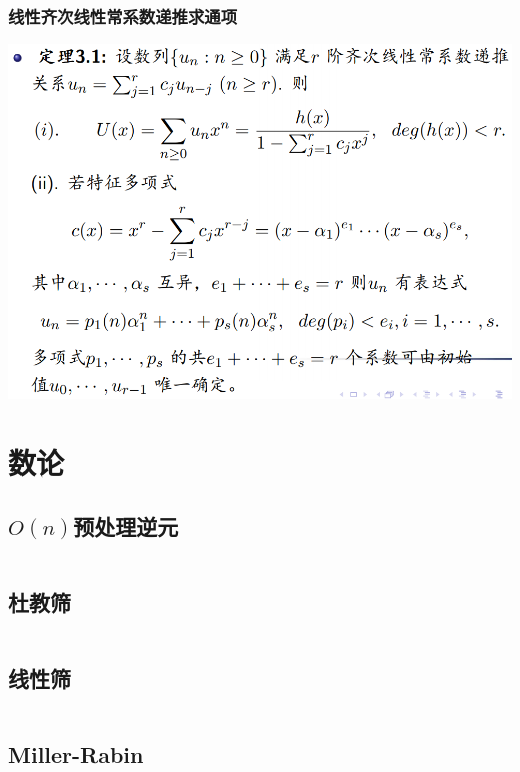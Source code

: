 \documentclass[a4paper]{article}
\begin{document}
\begin{multicols}{2}
				\subsubsection{线性齐次线性常系数递推求通项}
					\includegraphics[scale = 0.27]{../src/math/线性齐次线性常系数递推.png}


		\section{数论}

			\subsection{$O(n)$预处理逆元}
				\inputminted{cpp}{../src/numbertheory/O(n)求逆元.cpp}

			\subsection{杜教筛}
				\inputminted{cpp}{../src/numbertheory/杜教筛.cpp}
			
			\subsection{线性筛}
				\inputminted{cpp}{../src/numbertheory/扩展线性筛.cpp}



			\subsection{Miller-Rabin}
				\inputminted{cpp}{../src/numbertheory/Miller-Rabin.cpp}


\end{multicols}
\end{document}
